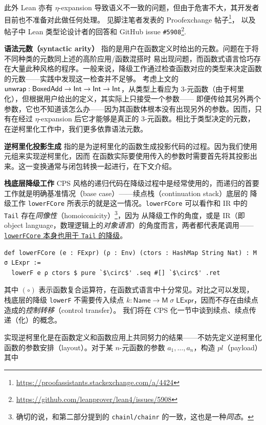 此外 Lean 亦有 $\eta$-expansion 导致语义不一致的问题，但由于危害不大，其开发者目前也不准备对此做任何处理。
见脚注笔者发表的 Proofexchange 帖子\footnote{\url{https://proofassistants.stackexchange.com/a/4424}}，
以及帖子中 Lean 类型论设计者的回答和 GitHub issue \texttt{\#5908}\footnote{\url{https://github.com/leanprover/lean4/issues/5908}}.

{\bf 语法元数（syntactic arity）} 指的是用户在函数定义时给出的元数。问题在于将不同种类的元数同上述的高阶应用/函数混搭时
易出现问题，而函数式语言恰巧存在大量此种风格的程序。一般来说，降级工作通过检查函数对应的类型来决定函数的元数——实践中发现这一检查并不足够。
考虑上文的 $\mathsf{unwrap} : \mathsf{BoxedAdd}\to\mathsf{Int}\to\mathsf{Int}\to\mathsf{Int}$，从类型上看应为 3-元函数（由于柯里化），但根据用户给出的定义，其实际上只接受一个参数——
即便传给其另外两个参数，它也不知道该怎么办——因为其函数体根本没有出现另外的参数。因而，只有在经过 $\eta$-expansion 后它才能够是真正的 3-元函数。相比于类型决定的元数，
在逆柯里化工作中，我们更多依靠语法元数。

{\bf 逆柯里化投影生成} 指的是为逆柯里化的函数生成投影代码的过程。因为我们使用元组来实现逆柯里化，因而
在函数实际要使用传入的参数时需要首先将其投影出来。这一变换通常与闭包转换一起进行，在下文介绍。

{\bf 栈底层降级工作} CPS 风格的递归代码在降级过程中是经常使用的，而递归的首要工作就是明确基准情况（base case）——续点栈（continuation stack）底层的
降级工作 \texttt{lowerFCore} 所表示的就是这一情况。\texttt{lowerFCore} 可以看作和 IR 中的 \texttt{Tail} 存在\emph{同像性}（homoiconicity）\footnote{确切的说，和第二部分提到的 \texttt{chainl/chainr} 的一致，这也是一种\emph{同态}。}，因为
从降级工作的角度，或是 IR（即 object language，数理逻辑上的\emph{对象语言}）的角度而言，两者都代表尾调用——\underline{\texttt{lowerFCore} 本身也用于 \texttt{Tail} 的降级}。
\begin{verbatim}
def lowerFCore (e : FExpr) (ρ : Env) (ctors : HashMap String Nat) : M σ LExpr :=
  lowerF e ρ ctors $ pure `$\circ$' .seq #[] `$\circ$' .ret
\end{verbatim}
其中 $(\circ)$ 表示函数复合运算符，在函数式语言中十分常见。对比之可以发现，
栈底层的降级 \texttt{lowerF} 不需要传入续点 $k :\mathsf{Name}\to\mathsf{M}\;\sigma\;\mathsf{LExpr}$，因而不存在由续点造成的\emph{控制转移}（control transfer）。
我们将在 CPS 化一节中谈到续点、续点传递（化）的概念。

实现逆柯里化是在函数定义和函数应用上共同努力的结果——不妨先定义逆柯里化函数的参数安排（layout）。对于某 $n$-元函数的参数 $a_1,\dots,a_n$，构造 $pl$（payload）其中

